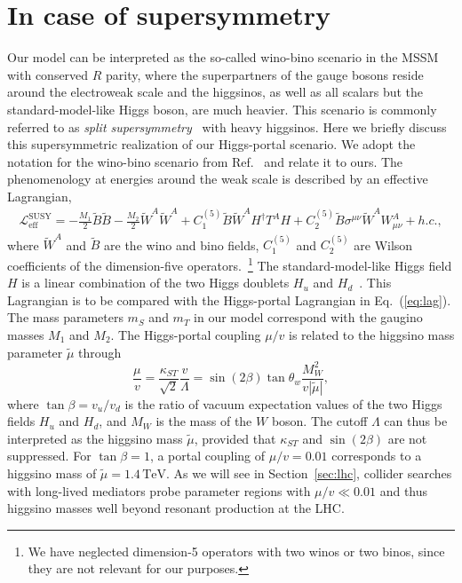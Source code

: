 \documentclass[nofootinbib,prd,aps,superscriptaddress,preprintnumbers]{revtex4}
\renewcommand{\emph}{\textit}
\begin{document}
\section{In case of supersymmetry}\label{sec:susy}
%
\noindent
Our model can be interpreted as the so-called wino-bino scenario in the MSSM with conserved $R$ parity, where the superpartners of the gauge bosons reside around the electroweak scale and the higgsinos, as well as all scalars but the standard-model-like Higgs boson, are much heavier. This scenario is commonly referred to as \emph{split supersymmetry}~\cite{ArkaniHamed:2004fb} with heavy higgsinos. Here we briefly discuss this supersymmetric realization of our Higgs-portal scenario. We adopt the notation for the wino-bino scenario from Ref.~\cite{Nagata:2015pra} and relate it to ours. The phenomenology at energies around the weak scale is described by an effective Lagrangian, 
\begin{align}\label{eq:lag-susy}
\mathcal{L}_{\text{eff}}^{\text{SUSY}} = -\frac{M_1}{2}\widetilde{B}\widetilde{B} - \frac{M_2}{2}\widetilde{W}^A\widetilde{W}^A + C_1^{(5)}\widetilde{B}\widetilde{W}^A H^\dagger T^A H + C_2^{(5)}\widetilde{B}\sigma^{\mu\nu}\widetilde{W}^A W_{\mu\nu}^A + h.c.,
\end{align}
where $\widetilde{W}^A$ and $\widetilde{B}$ are the wino and bino fields, $C_1^{(5)}$ and $C_2^{(5)}$ are Wilson coefficients of the dimension-five operators.~\footnote{We have neglected dimension-5 operators with two winos or two binos, since they are not relevant for our purposes.} The standard-model-like Higgs field $H$ is a linear combination of the two Higgs doublets $H_u$ and $H_d$~\cite{ArkaniHamed:2004fb}. This Lagrangian is to be compared with the Higgs-portal Lagrangian in Eq.~(\ref{eq:lag}). The mass para\-me\-ters $m_S$ and $m_T$ in our model correspond with the gaugino masses $M_1$ and $M_2$. The Higgs-portal coupling $\mu/v$ is related to the higgsino mass parameter $\widetilde{\mu}$ through
\begin{equation}\label{eq:higgsino}
  \frac{\mu}{v} = \frac{\kappa_{ST}}{\sqrt{2}}\frac{v}{\Lambda} = \sin(2\beta) \tan\theta_w \frac{M_W^2}{v|\widetilde{\mu}|},
\end{equation}
where $\tan\beta = v_u/v_d$ is the ratio of vacuum expectation values of the two Higgs fields $H_u$ and $H_d$, and $M_W$ is the mass of the $W$ boson. The cutoff $\Lambda$ can thus be interpreted as the higgsino mass $\widetilde{\mu}$, provided that $\kappa_{ST}$ and $\sin(2\beta)$ are not suppressed. For $\tan\beta = 1$, a portal coupling of $\mu/v = 0.01$ corresponds to a higgsino mass of $\widetilde{\mu} = 1.4\,\text{TeV}$. As we will see in Section~\ref{sec:lhc}, collider searches with long-lived mediators probe parameter regions with $\mu/v \ll 0.01$ and thus higgsino masses well beyond resonant production at the LHC.
\end{document}
